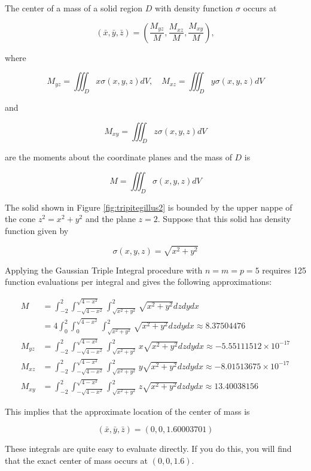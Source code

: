 \begin{example}
The center of a mass of a solid region $D$ with density function $\sigma$ occurs at

$$
(\bar{x}, \bar{y}, \bar{z})=\left(\frac{M_{y z}}{M}, \frac{M_{x z}}{M}, \frac{M_{x y}}{M}\right),
$$

where

$$
M_{y z}=\iiint_{D} x \sigma(x, y, z) d V, \quad M_{x z}=\iiint_{D} y \sigma(x, y, z) d V
$$

and

$$
M_{x y}=\iiint_{D} z \sigma(x, y, z) d V
$$

are the moments about the coordinate planes and the mass of $D$ is

$$
M=\iiint_{D} \sigma(x, y, z) d V
$$

The solid shown in Figure \ref{fig:tripitegillus2} is bounded by the upper nappe of the cone $z^{2}=x^{2}+y^{2}$ and the plane $z=2$. Suppose that this solid has density function given by

$$
\sigma(x, y, z)=\sqrt{x^{2}+y^{2}}
$$


Applying the Gaussian Triple Integral procedure with $n=m=p=5$ requires 125 function evaluations per integral and gives the following approximations:

$$
\begin{aligned}
M & =\int_{-2}^{2} \int_{-\sqrt{4-x^{2}}}^{\sqrt{4-x^{2}}} \int_{\sqrt{x^{2}+y^{2}}}^{2} \sqrt{x^{2}+y^{2}} d z d y d x \\
& =4 \int_{0}^{2} \int_{0}^{\sqrt{4-x^{2}}} \int_{\sqrt{x^{2}+y^{2}}}^{2} \sqrt{x^{2}+y^{2}} d z d y d x \approx 8.37504476 \\
M_{y z} & =\int_{-2}^{2} \int_{-\sqrt{4-x^{2}}}^{\sqrt{4-x^{2}}} \int_{\sqrt{x^{2}+y^{2}}}^{2} x \sqrt{x^{2}+y^{2}} d z d y d x \approx-5.55111512 \times 10^{-17} \\
M_{x z} & =\int_{-2}^{2} \int_{-\sqrt{4-x^{2}}}^{\sqrt{4-x^{2}}} \int_{\sqrt{x^{2}+y^{2}}}^{2} y \sqrt{x^{2}+y^{2}} d z d y d x \approx-8.01513675 \times 10^{-17} \\
M_{x y} & =\int_{-2}^{2} \int_{-\sqrt{4-x^{2}}}^{\sqrt{4-x^{2}}} \int_{\sqrt{x^{2}+y^{2}}}^{2} z \sqrt{x^{2}+y^{2}} d z d y d x \approx 13.40038156
\end{aligned}
$$

This implies that the approximate location of the center of mass is

$$
(\bar{x}, \bar{y}, \bar{z})=(0,0,1.60003701)
$$

These integrals are quite easy to evaluate directly. If you do this, you will find that the exact center of mass occurs at $(0,0,1.6)$.
\end{example}

